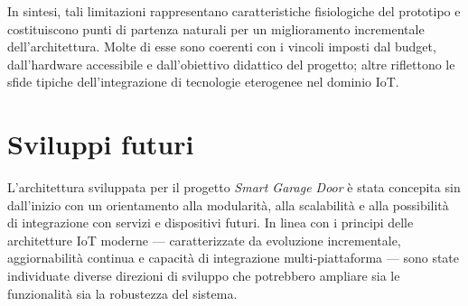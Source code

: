 In sintesi, tali limitazioni rappresentano caratteristiche fisiologiche del prototipo e costituiscono punti di partenza naturali per un miglioramento incrementale dell'architettura. Molte di esse sono coerenti con i vincoli imposti dal budget, dall'hardware accessibile e dall'obiettivo didattico del progetto; altre riflettono le sfide tipiche dell'integrazione di tecnologie eterogenee nel dominio IoT.

\section{Sviluppi futuri}
L'architettura sviluppata per il progetto \textit{Smart Garage Door} è stata concepita sin dall'inizio con un orientamento alla modularità, alla scalabilità e alla possibilità di integrazione con servizi e dispositivi futuri. In linea con i principi delle architetture IoT moderne — caratterizzate da evoluzione incrementale, aggiornabilità continua e capacità di integrazione multi-piattaforma \cite{Gubbi2013} — sono state individuate diverse direzioni di sviluppo che potrebbero ampliare sia le funzionalità sia la robustezza del sistema.

